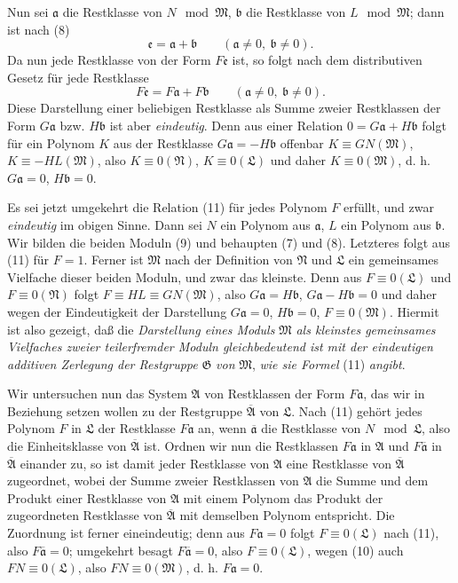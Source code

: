 \documentclass[11pt]{article}
\newcommand{\mM}{\mathfrak{M}}
\newcommand{\mN}{\mathfrak{N}}
\newcommand{\mL}{\mathfrak{L}}
\newcommand{\mG}{\mathfrak{G}}
\newcommand{\mA}{\mathfrak{A}}
\newcommand{\ma}{\mathfrak{a}}
\newcommand{\mb}{\mathfrak{b}}
\newcommand{\me}{\mathfrak{e}}
\newcommand{\mbarA}{\overline{\mathfrak{A}}}
\newcommand{\bara}{\overline{\mathfrak{a}}}
\begin{document}
Nun sei $\ma$ die Restklasse von $N\mod\mM$, $\mb$ die Restklasse von $L\mod\mM$; dann ist nach (8)
\[
 \me=\ma+\mb\qquad(\ma\ne0,\ \mb\ne0).
\]
Da nun jede Restklasse von der Form $F\me$ ist, so folgt nach dem distributiven Gesetz für jede Restklasse
\begin{equation}
 F\me=F\ma+F\mb\qquad(\ma\ne0,\ \mb\ne0).
\tag{11}
\end{equation}
Diese Darstellung einer beliebigen Restklasse als Summe zweier Restklassen der Form $G\ma$ bzw. $H\mb$ ist aber \emph{eindeutig}. Denn aus einer Relation $0=G\ma+H\mb$ folgt für ein Polynom $K$ aus der Restklasse $G\ma=-H\mb$ offenbar $K\equiv GN(\mM)$, $K\equiv-HL(\mM)$, also $K\equiv0(\mN)$, $K\equiv0(\mL)$ und daher $K\equiv0(\mM)$, d. h. $G\ma=0$, $H\mb=0$.

Es sei jetzt umgekehrt die Relation (11) für jedes Polynom $F$ erfüllt, und zwar \emph{eindeutig} im obigen Sinne. Dann sei $N$ ein Polynom aus $\ma$, $L$ ein Polynom aus $\mb$. Wir bilden die beiden Moduln (9) und behaupten (7) und (8). Letzteres folgt aus (11) für $F=1$. Ferner ist $\mM$ nach der Definition von $\mN$ und $\mL$ ein gemeinsames Vielfache dieser beiden Moduln, und zwar das kleinste. Denn aus $F\equiv0(\mL)$ und $F\equiv0(\mN)$ folgt $F\equiv HL\equiv GN(\mM)$, also $G\ma=H\mb$, $G\ma-H\mb=0$ und daher wegen der Eindeutigkeit der Darstellung $G\ma=0$, $H\mb=0$, $F\equiv0(\mM)$. Hiermit ist also gezeigt, daß die \emph{Darstellung eines Moduls} $\mM$ \emph{als kleinstes gemeinsames Vielfaches zweier teilerfremder Moduln gleichbedeutend ist mit der eindeutigen additiven Zerlegung der Restgruppe} $\mG$ \emph{von} $\mM$, \emph{wie sie Formel} (11) \emph{angibt}.

Wir untersuchen nun das System $\mA$ von Restklassen der Form $F\ma$, das wir in Beziehung setzen wollen zu der Restgruppe $\mbarA$ von $\mL$. Nach (11) gehört jedes Polynom $F$ in $\mL$ der Restklasse $F\ma$ an, wenn $\bara$ die Restklasse von $N\mod\mL$, also die Einheitsklasse von $\mbarA$ ist. Ordnen wir nun die Restklassen $F\ma$ in $\mA$ und $F\bara$ in $\mbarA$ einander zu, so ist damit jeder Restklasse von $\mA$ eine Restklasse von $\mbarA$ zugeordnet, wobei der Summe zweier Restklassen von $\mA$ die Summe und dem Produkt einer Restklasse von $\mA$ mit einem Polynom das Produkt der zugeordneten Restklasse von $\mbarA$ mit demselben Polynom entspricht. Die Zuordnung ist ferner eineindeutig; denn aus $F\ma=0$ folgt $F\equiv0(\mL)$ nach (11), also $F\bara=0$; umgekehrt besagt $F\bara=0$, also $F\equiv0(\mL)$, wegen (10) auch $FN\equiv0(\mL)$, also $FN\equiv0(\mM)$, d. h. $F\ma=0$.
\end{document}

